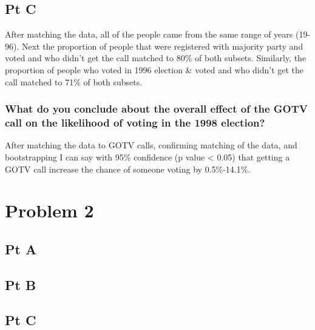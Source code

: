 \documentclass[
]{article}
\begin{document}
\hypertarget{pt-c}{%
\subsection{Pt C}\label{pt-c}}

After matching the data, all of the people came from the same range of
years (19-96). Next the proportion of people that were registered with
majority party and voted and who didn't get the call matched to 80\% of
both subsets. Similarly, the proportion of people who voted in 1996
election \& voted and who didn't get the call matched to 71\% of both
subsets.

\hypertarget{what-do-you-conclude-about-the-overall-effect-of-the-gotv-call-on-the-likelihood-of-voting-in-the-1998-election}{%
\subsubsection{What do you conclude about the overall effect of the GOTV
call on the likelihood of voting in the 1998
election?}\label{what-do-you-conclude-about-the-overall-effect-of-the-gotv-call-on-the-likelihood-of-voting-in-the-1998-election}}

After matching the data to GOTV calls, confirming matching of the data,
and bootstrapping I can say with 95\% confidence (p value \textless{}
0.05) that getting a GOTV call increase the chance of someone voting by
0.5\%-14.1\%.

\hypertarget{problem-2}{%
\section{Problem 2}\label{problem-2}}

\hypertarget{pt-a-1}{%
\subsection{Pt A}\label{pt-a-1}}

\hypertarget{pt-b-1}{%
\subsection{Pt B}\label{pt-b-1}}

\hypertarget{pt-c-1}{%
\subsection{Pt C}\label{pt-c-1}}
\end{document}
